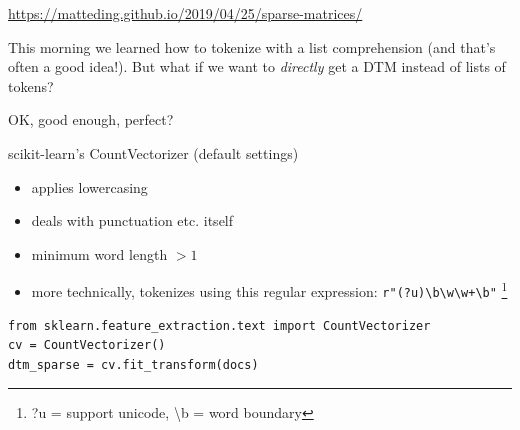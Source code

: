 \documentclass[compress]{beamer}
\begin{document}
{
	\begin{frame}
\url{https://matteding.github.io/2019/04/25/sparse-matrices/}
\end{frame}
}


\begin{frame}[standout]
This morning we learned how to tokenize with a list comprehension (and that's often a good idea!). But what if we want to \emph{directly} get a DTM instead of lists of tokens?
\end{frame}


\begin{frame}[fragile]{OK, good enough, perfect?}
\begin{block}{scikit-learn's CountVectorizer (default settings)}
\begin{itemize}
	\item applies lowercasing
	\item deals with punctuation etc. itself
	\item minimum word length $>1$
	\item more technically, tokenizes using this regular expression: \texttt{r"(?u)\textbackslash b\textbackslash w\textbackslash w+\textbackslash b"} \footnote{?u = support unicode, \textbackslash b = word boundary}
\end{itemize}
\end{block}
\begin{lstlisting}
from sklearn.feature_extraction.text import CountVectorizer
cv = CountVectorizer()
dtm_sparse = cv.fit_transform(docs)
\end{lstlisting}
\end{frame}
\end{document}
